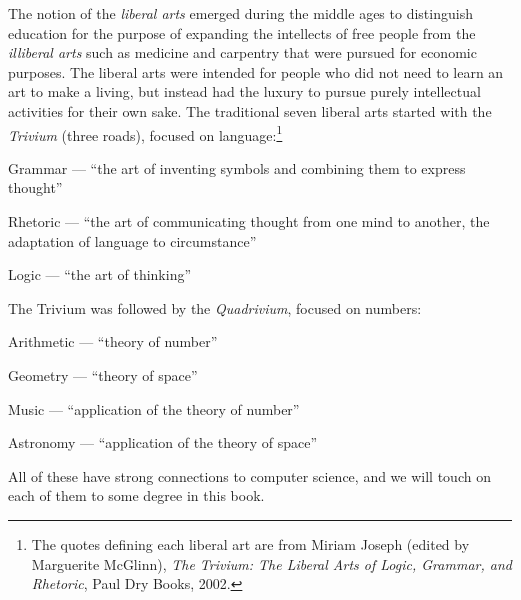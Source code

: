 
The notion of the \emph{liberal arts} emerged during the middle ages to distinguish education for the purpose of expanding the intellects of free people from the \emph{illiberal arts} such as medicine and carpentry that were pursued for economic purposes.  The liberal arts were intended for people who did not need to learn an art to make a living, but instead had the luxury to pursue purely intellectual activities for their own sake.  
The traditional seven liberal arts started with the \emph{Trivium} (three roads), focused on language:\footnote{
The quotes defining each liberal art are from Miriam Joseph (edited by Marguerite McGlinn), \emph{The Trivium: The Liberal Arts of Logic, Grammar, and Rhetoric}, Paul Dry Books, 2002.}
\begin{itemtight}
\item Grammar --- ``the art of inventing symbols and combining them to express thought''
\item Rhetoric --- ``the art of communicating thought from one mind to another, the adaptation of language to circumstance''
\item Logic --- ``the art of thinking''
\end{itemtight}

The Trivium was followed by the \emph{Quadrivium}, focused on numbers:
\begin{itemtight}
\item Arithmetic --- ``theory of number''
\item Geometry --- ``theory of space''
\item Music --- ``application of the theory of number''
\item Astronomy --- ``application of the theory of space''
\end{itemtight}

All of these have strong connections to computer science, and we will touch on each of them to some degree in this book.  


